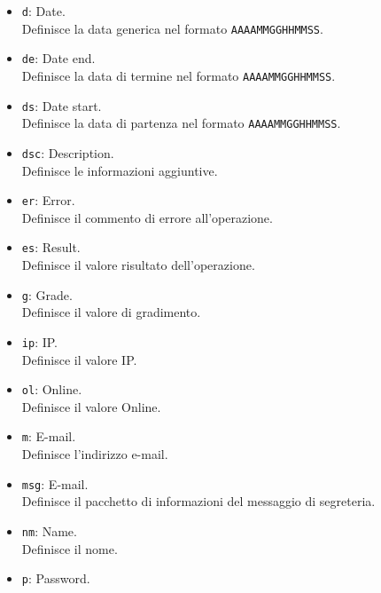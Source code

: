 {\begin{itemize}
{\begin{itemize}
{\begin{itemize}
				\end{itemize}
		Può avere gli attributi opzionali:
				\begin{itemize}
					\item[-] \texttt{type}: Type, definisce il sottotipo di operazione da effettuare;
					\item[-] \texttt{h}: Hours, definisce il numero di ore.
				\end{itemize}
			}
		\end{itemize}
		}
		\item[] \texttt{d}:{ Date.\\
		Definisce la data generica nel formato \texttt{AAAAMMGGHHMMSS}.
		}
		\item[] \texttt{de}:{ Date end.\\
		Definisce la data di termine nel formato \texttt{AAAAMMGGHHMMSS}.
		}
		\item[] \texttt{ds}:{ Date start.\\
		Definisce la data di partenza nel formato \texttt{AAAAMMGGHHMMSS}.
		}		
		\item[] \texttt{dsc}:{ Description.\\
		Definisce le informazioni aggiuntive.
		}		
		\item[] \texttt{er}:{ Error.\\
		Definisce il commento di errore all'operazione.
		}
		\item[] \texttt{es}:{ Result.\\
		Definisce il valore risultato dell'operazione.
		}
		\item[] \texttt{g}:{ Grade.\\
		Definisce il valore di gradimento.
		}
		\item[] \texttt{ip}:{ IP.\\
		Definisce il valore IP.
		}
		\item[] \texttt{ol}:{ Online.\\
		Definisce il valore Online.
		}	
		\item[] \texttt{m}:{ E-mail.\\
		Definisce l'indirizzo e-mail.
		}
		\item[] \texttt{msg}:{ E-mail.\\
		Definisce il pacchetto di informazioni del messaggio di segreteria.
		}
		\item[] \texttt{nm}:{ Name.\\
		Definisce il nome.
		}
		\item[] \texttt{p}:{ Password.\\
}
\end{itemize}}
